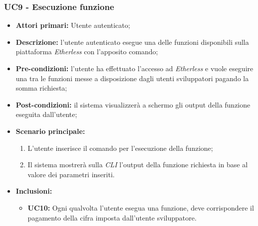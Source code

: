 \subsubsection{UC9 - Esecuzione funzione}
\begin{itemize}
	\item \textbf{Attori primari:} Utente autenticato;
	\item \textbf{Descrizione:} l'utente autenticato esegue una delle funzioni disponibili sulla piattaforma \textit{Etherless} con l'apposito comando; 
	\item \textbf{Pre-condizioni:} l'utente ha effettuato l'accesso ad \textit{Etherless} e vuole eseguire una tra le funzioni messe a disposizione dagli utenti sviluppatori pagando la somma richiesta;
	\item \textbf{Post-condizioni:} il sistema visualizzerà a schermo gli output della funzione eseguita dall'utente;
	\item \textbf{Scenario principale:} 
	\begin{enumerate}
		\item L'utente inserisce il comando per l'esecuzione della funzione;
		\item Il sistema mostrerà sulla \textit{CLI\glo} l'output della funzione richiesta in base al valore dei parametri inseriti.
	\end{enumerate}
	\item \textbf{Inclusioni:} 
	\begin{itemize}
		\item \textbf{UC10:} Ogni qualvolta l'utente esegua una funzione, deve corrispondere il pagamento della cifra imposta dall'utente sviluppatore.
	\end{itemize}
\end{itemize}